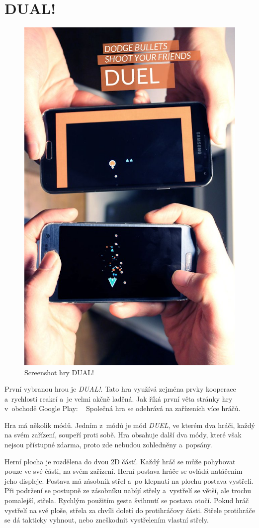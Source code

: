 \section{DUAL!}

\begin{figure}
    \centering
    \includegraphics[width=0.5\linewidth]{assets/competitive-apps/dual.jpg}
    \caption{Screenshot hry DUAL!~\cite{seabaa_dual}}
    \label{fig:dual}
\end{figure}

První vybranou hrou je \emph{DUAL!}.
Tato hra využívá zejména prvky kooperace a~rychlosti reakcí
a~je velmi akčně laděná.
Jak říká první věta stránky hry v~obchodě Google Play:
\emph{}~\cite{seabaa_dual}
Společná hra se odehrává na zařízeních více hráčů.

Hra má několik módů.
Jedním z~módů je mód \emph{DUEL}, ve kterém dva hráči,
každý na svém zařízení,
soupeří proti sobě.
Hra obsahuje další dva módy, které však nejsou přístupné zdarma,
proto zde nebudou zohledněny a~popsány.

Herní plocha je rozdělena do dvou 2D částí.
Každý hráč se může pohybovat pouze ve své části, na svém zařízení.
Herní postava hráče se ovládá natáčením jeho displeje.
Postava má zásobník střel a~po klepnutí na plochu postava vystřelí.
Při podržení se postupně ze zásobníku nabíjí střely
a~vystřelí se větší, ale trochu pomalejší, střela.
Rychlým použitím gesta švihnutí se postava otočí.
Pokud hráč vystřelí na své ploše,
střela za chvíli doletí do protihráčovy části.
Střele protihráče se dá takticky vyhnout,
nebo zneškodnit vystřelením vlastní střely.

